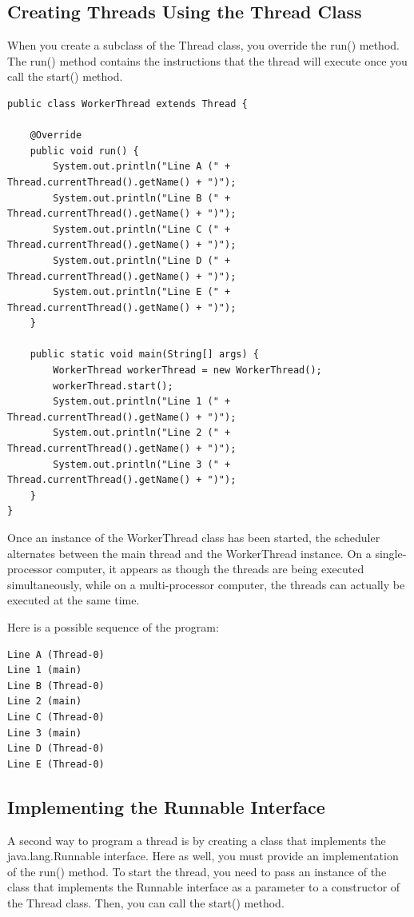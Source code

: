 \subsection{Creating Threads Using the Thread Class}

When you create a subclass of the Thread class, you override the run() method. The run() method contains the instructions that the thread will execute once you call the start() method.

\begin{lstlisting}
public class WorkerThread extends Thread {

	@Override
	public void run() {
		System.out.println("Line A (" + Thread.currentThread().getName() + ")");
		System.out.println("Line B (" + Thread.currentThread().getName() + ")");
		System.out.println("Line C (" + Thread.currentThread().getName() + ")");
		System.out.println("Line D (" + Thread.currentThread().getName() + ")");
		System.out.println("Line E (" + Thread.currentThread().getName() + ")");
	}

	public static void main(String[] args) {
		WorkerThread workerThread = new WorkerThread();
		workerThread.start();
		System.out.println("Line 1 (" + Thread.currentThread().getName() + ")");
		System.out.println("Line 2 (" + Thread.currentThread().getName() + ")");
		System.out.println("Line 3 (" + Thread.currentThread().getName() + ")");
	}
}
\end{lstlisting}


Once an instance of the WorkerThread class has been started, the scheduler alternates between the main thread and the WorkerThread instance. On a single-processor computer, it appears as though the threads are being executed simultaneously, while on a multi-processor computer, the threads can actually be executed at the same time.

Here is a possible sequence of the program:

\begin{verbatim}
Line A (Thread-0)
Line 1 (main)
Line B (Thread-0)
Line 2 (main)
Line C (Thread-0)
Line 3 (main)
Line D (Thread-0)
Line E (Thread-0)
\end{verbatim}


\subsection{Implementing the Runnable Interface}

A second way to program a thread is by creating a class that implements the java.lang.Runnable interface. Here as well, you must provide an implementation of the run() method. To start the thread, you need to pass an instance of the class that implements the Runnable interface as a parameter to a constructor of the Thread class. Then, you can call the start() method.


